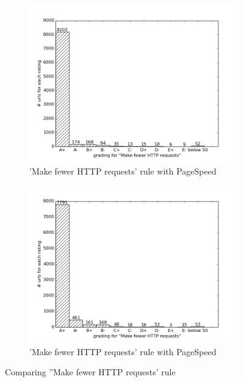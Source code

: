 \documentclass[conference]{IEEEtran}
\begin{document}
\begin{figure}
    \centering
    \begin{subfigure}[b]{\columnwidth}        %
        \centering
	\includegraphics[scale=0.33]{new-img-jpg/container-jpg/Make fewer HTTP requests.jpg}
        \caption{'Make fewer HTTP requests' rule with PageSpeed}
        \label{fig:httpr-pagespeed}
    \end{subfigure}
    \hfill
    \begin{subfigure}[b]{\columnwidth}        %
        \centering
	\includegraphics[scale=0.33]{new-img-jpg/deploy-jpg/Make fewer HTTP requests.jpg}
        \caption{'Make fewer HTTP requests' rule with PageSpeed}
        \label{fig:httpr-nopagespeed}
    \end{subfigure}
    \caption{Comparing ''Make fewer HTTP requests' rule}
    \label{fig:httpr-comparison}
\end{figure}
\end{document}
